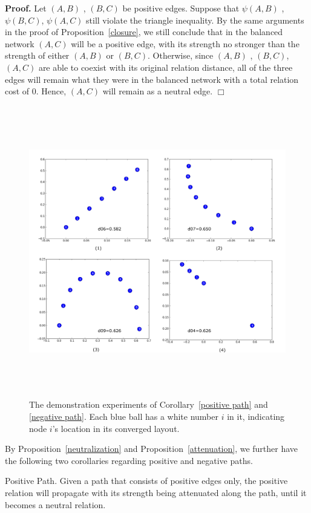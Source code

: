 {\bf Proof.} Let $(A,B)$ , $(B,C)$ be positive edges. Suppose that $\psi(A,B)$ , $\psi(B,C)$, $\psi(A,C)$ still violate the triangle inequality. By the same arguments in the proof of Proposition~\ref{closure}, we still conclude that in the balanced network $(A,C)$ will be a positive edge, with its strength no stronger than the strength of either $(A,B)$ or $(B,C)$. Otherwise, since $(A,B)$ , $(B,C)$, $(A,C)$ are able to coexist with its original relation distance, all of the three edges will remain what they were in the balanced network with a total relation cost of $0$. Hence, $(A,C)$ will remain as a neutral edge. $\Box$\\
\begin{figure}[th]
\centering
\includegraphics[height=5.0in]{Figs/demo2.pdf}
\caption{\label{demo2}The demonstration experiments of Corollary~\ref{positive path} and \ref{negative path}. Each blue ball has a white number $i$ in it, indicating node $i$'s location in its converged layout.}
\end{figure}
By Proposition~\ref{neutralization}  and Proposition~\ref{attenuation},  we further have the following two corollaries regarding positive and negative paths.
\begin{corollary}\label{positive path}
Positive Path. Given a path that consists of positive edges only, the positive relation will propagate with its strength being attenuated along the path, until it becomes a neutral relation.
\end{corollary}
